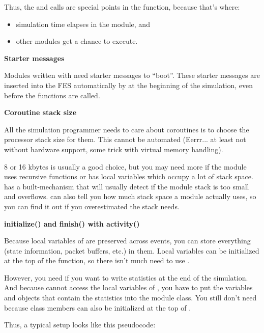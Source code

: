 Thus, the  and  calls are
special points in the  function, because that's
where:
\begin{itemize}
\item{simulation time elapses in the module, and}
\item{other modules get a chance to execute.}
\end{itemize}


\textbf{Starter messages}


Modules written with  need starter
messages to ``boot''.  These starter messages
are inserted into the FES automatically by {\opp} at the
beginning of the simulation, even before the 
functions are called.


\textbf{Coroutine stack size}


All the simulation programmer needs to care about coroutines is to
choose the processor stack size for them.
This cannot be automated (Eerrr... at least not without hardware
support, some trick with virtual memory handling).


8 or 16 kbytes is usually a good choice, but you may need more if the
module uses recursive functions or has local variables which occupy a
lot of stack space. {\opp} has a built-mechanism that will usually
detect if the module stack is too small and
overflows. {\opp} can also tell you how much
stack space a module actually uses, so you can find
it out if you overestimated the stack needs.


\textbf{initialize() and finish() with activity()}


Because local variables of  are preserved across
events, you can store everything (state information, packet buffers,
etc.) in them. Local variables can be initialized at the top of the
 function, so there isn't much need to use
.


However, you need  if you want to write statistics at
the end of the simulation. And because  cannot access
the local variables of , you have to put the variables
and objects that contain the statistics into the module class.
You still don't need  because class members can also
be initialized at the top of .


Thus, a typical setup looks like this pseudocode:


